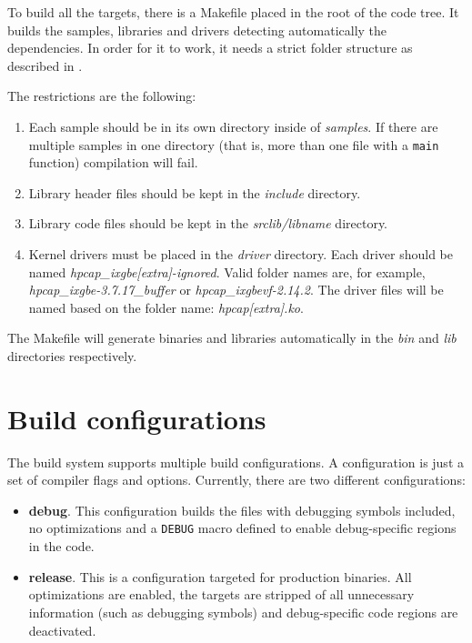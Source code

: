\documentclass[oneside]{hpman}
\begin{document}
To build all the targets, there is a Makefile placed in the root of the code tree. It builds the samples, libraries and drivers detecting automatically the dependencies. In order for it to work, it needs a strict folder structure as described in .

The restrictions are the following:

\begin{enumerate}
\item Each sample should be in its own directory inside of \textit{samples}. If there are multiple samples in one directory (that is, more than one file with a \texttt{main} function) compilation will fail.
\item Library header files should be kept in the \textit{include} directory.
\item Library code files should be kept in the \textit{srclib/libname} directory.
\item Kernel drivers must be placed in the \textit{driver} directory. Each driver should be named \textit{hpcap\_ixgbe[extra]-ignored}. Valid folder names are, for example, \textit{hpcap\_ixgbe-3.7.17\_buffer} or \textit{hpcap\_ixgbevf-2.14.2}. The driver files will be named based on the folder name: \textit{hpcap[extra].ko}.
\end{enumerate}

The Makefile will generate binaries and libraries automatically in the \textit{bin} and \textit{lib} directories respectively.

\section{Build configurations}
\label{sec:build:configs}

The build system supports multiple build configurations. A configuration is just a set of compiler flags and options. Currently, there are two different configurations:

\begin{itemize}
\item \textbf{debug}. This configuration builds the files with debugging symbols included, no optimizations and a \texttt{DEBUG} macro defined to enable debug-specific regions in the code.
\item \textbf{release}. This is a configuration targeted for production binaries. All optimizations are enabled, the targets are stripped of all unnecessary information (such as debugging symbols) and debug-specific code regions are deactivated.
\end{itemize}
\end{document}
